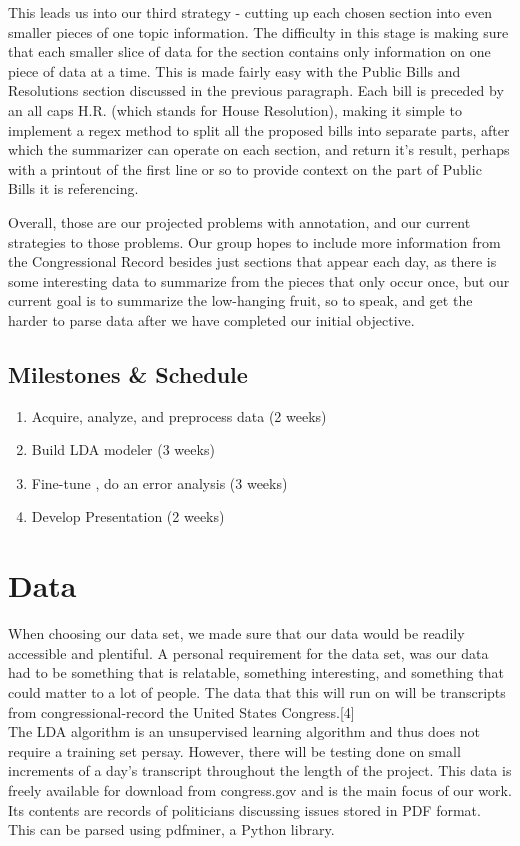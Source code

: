 \documentclass[11pt,a4paper]{article}
\begin{document}
	This leads us into our third strategy - cutting up each chosen section into even smaller pieces of one topic information.  The difficulty in this stage is making sure that each smaller slice of data for the section contains only information on one piece of data at a time.  This is made fairly easy with the Public Bills and Resolutions section discussed in the previous paragraph.  Each bill is preceded by an all caps H.R. (which stands for House Resolution), making it simple to implement a regex method to split all the proposed bills into separate parts, after which the summarizer can operate on each section, and return it's result, perhaps with a printout of the first line or so to provide context on the part of Public Bills it is referencing.

	Overall, those are our projected problems with annotation, and our current strategies to those problems.  Our group hopes to include more information from the Congressional Record besides just sections that appear each day, as there is some interesting data to summarize from the pieces that only occur once, but our current goal is to summarize the low-hanging fruit, so to speak, and get the harder to parse data after we have completed our initial objective.


\subsection{Milestones \& Schedule}

\begin{enumerate}
    \item Acquire, analyze, and preprocess data (2 weeks)
    \item Build LDA modeler (3 weeks)
    \item Fine-tune , do an error analysis (3 weeks)
    \item Develop Presentation (2 weeks)
\end{enumerate}

\section{Data}

When choosing our data set, we made sure that our data would be readily accessible and plentiful. A personal requirement for the data set, was our data had to be something that is relatable, something interesting, and something that could matter to a lot of people. The data that this will run on will be transcripts from congressional-record the United States Congress.[4] \\
The LDA algorithm is an unsupervised learning algorithm and thus does not require a training set persay. However, there will be testing done on small increments of a day's transcript throughout the length of the project. This data is freely available for download from congress.gov and is the main focus of our work. Its contents are records of politicians discussing issues stored in PDF format. This can be parsed using pdfminer, a Python library.
\end{document}
